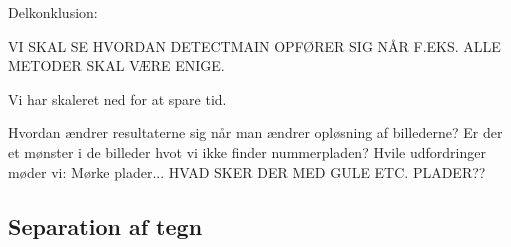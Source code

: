 \begin{comment}
\begin{tabular}{|l|l|l|l|l|}
\hline
\rowcolor[gray]{0.9} \multicolumn{5}{|>{\columncolor[gray]{0.9}}c|}{\textbf{Kontrolsæt}} \\ \hline
Param 1 & Min. antal enige & Skalering & Overordnet resultat & Sande positiver\\ \hline
1 & 1 & 1 & 19 \% & 19 \%\\ \hline
2 & 2 & 2 & 19 \% & 21 \% \\ \hline
3 & 3 & 3 & 19 \% & 22 \% \\ \hline
3 & 4 & 3 & 19 \% & 22 \% \\ \hline
2 & 5 & 2 & 19 \% & 21 \% \\ 
\hline
\end{tabular}

\end{comment}



\begin{comment} %
\subsubsection*{Observeret sæt på 407 billeder}
Scale: 0.25
DetectMain: 96.6/99.24
DetectQuant: 67.8/75.4
DetectSameness: 56.8/95.5
DetectContrastAvg: 62.7/85.0
DetectPlateness: 50.4/65.5
DetectCStretch: 84.0/92.7

Scale: 0.50 (Ekstremt langsomt)
DetectPlateness: 29.7/56.5
DetectCStretch:
\end{comment}


Delkonklusion:

VI SKAL SE HVORDAN DETECTMAIN OPFØRER SIG NÅR F.EKS. ALLE METODER SKAL VÆRE ENIGE.

Vi har skaleret ned for at spare tid.

Hvordan ændrer resultaterne sig når man ændrer opløsning af billederne?
Er der et mønster i de billeder hvot vi ikke finder nummerpladen? Hvile udfordringer møder vi: Mørke plader... 
HVAD SKER DER MED GULE ETC. PLADER??



\subsection{Separation af tegn}


